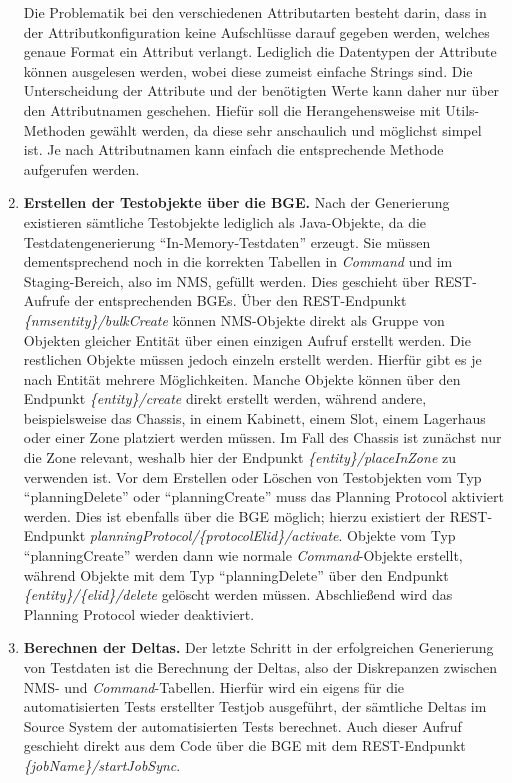 \begin{enumerate}
    Die Problematik bei den verschiedenen Attributarten besteht darin, dass in der Attributkonfiguration keine Aufschlüsse darauf gegeben werden, welches genaue Format ein Attribut verlangt. Lediglich die Datentypen der Attribute können ausgelesen werden, wobei diese zumeist einfache Strings sind. Die Unterscheidung der Attribute und der benötigten Werte kann daher nur über den Attributnamen geschehen. Hiefür soll die Herangehensweise mit Utils-Methoden gewählt werden, da diese sehr anschaulich und möglichst simpel ist. Je nach Attributnamen kann einfach die entsprechende Methode aufgerufen werden.
    \item \textbf{Erstellen der Testobjekte über die \ac{BGE}.} Nach der Generierung existieren sämtliche Testobjekte lediglich als Java-Objekte, da die Testdatengenerierung \enquote{In-Memory-Testdaten} erzeugt. Sie müssen dementsprechend noch in die korrekten Tabellen in \textit{Command} und im Staging-Bereich, also im \ac{NMS}, gefüllt werden. Dies geschieht über \ac{REST}-Aufrufe der entsprechenden \ac{BGE}s. Über den \ac{REST}-Endpunkt \textit{\{nmsentity\}/bulkCreate} können \ac{NMS}-Objekte direkt als Gruppe von Objekten gleicher Entität über einen einzigen Aufruf erstellt werden. Die restlichen Objekte müssen jedoch einzeln erstellt werden. Hierfür gibt es je nach Entität mehrere Möglichkeiten. Manche Objekte können über den Endpunkt \textit{\{entity\}/create} direkt erstellt werden, während andere, beispielsweise das Chassis, in einem Kabinett, einem Slot, einem Lagerhaus oder einer Zone platziert werden müssen. Im Fall des Chassis ist zunächst nur die Zone relevant, weshalb hier der Endpunkt \textit{\{entity\}/placeInZone} zu verwenden ist. Vor dem Erstellen oder Löschen von Testobjekten vom Typ \enquote{planningDelete} oder \enquote{planningCreate} muss das Planning Protocol aktiviert werden. Dies ist ebenfalls über die \ac{BGE} möglich; hierzu existiert der \ac{REST}-Endpunkt \textit{planningProtocol/\{protocolElid\}/activate}. Objekte vom Typ \enquote{planningCreate} werden dann wie normale \textit{Command}-Objekte erstellt, während Objekte mit dem Typ \enquote{planningDelete} über den Endpunkt \textit{\{entity\}/\{elid\}/delete} gelöscht werden müssen. Abschließend wird das Planning Protocol wieder deaktiviert.
    \item \textbf{Berechnen der Deltas.} Der letzte Schritt in der erfolgreichen Generierung von Testdaten ist die Berechnung der Deltas, also der Diskrepanzen zwischen \ac{NMS}- und \textit{Command}-Tabellen. Hierfür wird ein eigens für die automatisierten Tests erstellter Testjob ausgeführt, der sämtliche Deltas im Source System der automatisierten Tests berechnet. Auch dieser Aufruf geschieht direkt aus dem Code über die \ac{BGE} mit dem \ac{REST}-Endpunkt \textit{\{jobName\}/startJobSync}. 
\end{enumerate}


